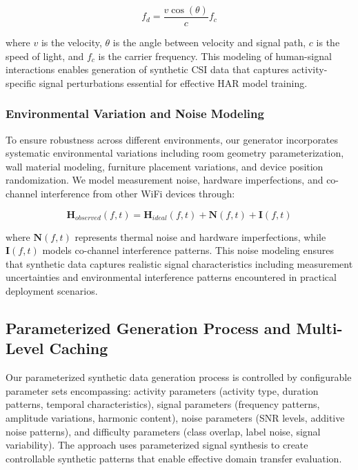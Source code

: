 \documentclass[journal]{IEEEtran}
\begin{document}
\begin{equation}
f_d = \frac{v \cos(\theta)}{c} f_c
\end{equation}

where $v$ is the velocity, $\theta$ is the angle between velocity and signal path, $c$ is the speed of light, and $f_c$ is the carrier frequency. This modeling of human-signal interactions enables generation of synthetic CSI data that captures activity-specific signal perturbations essential for effective HAR model training.

\subsubsection{Environmental Variation and Noise Modeling}

To ensure robustness across different environments, our generator incorporates systematic environmental variations including room geometry parameterization, wall material modeling, furniture placement variations, and device position randomization. We model measurement noise, hardware imperfections, and co-channel interference from other WiFi devices through:

\begin{equation}
\mathbf{H}_{observed}(f,t) = \mathbf{H}_{ideal}(f,t) + \mathbf{N}(f,t) + \mathbf{I}(f,t)
\end{equation}

where $\mathbf{N}(f,t)$ represents thermal noise and hardware imperfections, while $\mathbf{I}(f,t)$ models co-channel interference patterns. This noise modeling ensures that synthetic data captures realistic signal characteristics including measurement uncertainties and environmental interference patterns encountered in practical deployment scenarios.

\subsection{Parameterized Generation Process and Multi-Level Caching}

Our parameterized synthetic data generation process is controlled by configurable parameter sets encompassing: activity parameters (activity type, duration patterns, temporal characteristics), signal parameters (frequency patterns, amplitude variations, harmonic content), noise parameters (SNR levels, additive noise patterns), and difficulty parameters (class overlap, label noise, signal variability). The approach uses parameterized signal synthesis to create controllable synthetic patterns that enable effective domain transfer evaluation.
\end{document}
